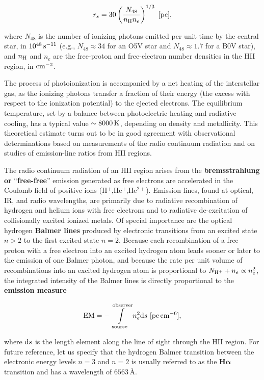 \documentclass[a4paper,10pt]{article}
\begin{document}
\begin{align*}
    r_s = 30 \left(\frac{N_{48}}{n_{\rm H}n_e}\right)^{1/3} ~ [{\rm pc}],
\end{align*}

{\noindent}where $N_{48}$ is the number of ionizing photons emitted per unit time by the central star, in $10^{48}\,{\rm s^{-11}}$ (e.g., $N_{48}\approx34$ for an O5V star and $N_{48}\approx1.7$ for a B0V star), and $n_{\rm H}$ and $n_e$ are the free-proton and free-electron number densities in the HII region, in ${\rm cm^{-3}}$.

{\noindent}The process of photoionization is accompanied by a
net heating of the interstellar gas, as the ionizing photons transfer a fraction of their energy (the excess with respect to the ionization potential) to the ejected electrons. The equilibrium temperature, set by a balance between photoelectric heating and radiative cooling, has a typical value $\sim8000\,{\rm K}$, depending on density and metallicity. This theoretical estimate turns out to be in good agreement with observational determinations based on measurements of the radio continuum radiation and on studies of emission-line ratios from HII regions.

{\noindent}The radio continuum radiation of an HII region arises
from the \textbf{bremsstrahlung or} ``\textbf{free-free}'' emission generated as free electrons are accelerated in the Coulomb field of positive ions (H$^+$,He$^+$,He$^{2+}$). Emission lines, found at optical, IR, and radio wavelengths, are primarily due to radiative recombination of hydrogen and helium ions with free electrons and to radiative de-excitation of collisionally excited ionized metals. Of special importance are the optical hydrogen \textbf{Balmer lines} produced by electronic transitions from an excited state $n>2$ to the first excited state $n=2$. Because each recombination of a free proton with a free electron into an excited hydrogen atom leads sooner or later to the emission of one Balmer photon, and because the rate per unit volume of recombinations into an excited hydrogen atom is proportional to $N_{\rm H^+} + n_e \propto n_e^2$, the integrated intensity of the Balmer lines is directly proportional to the \textbf{emission measure}

\begin{align*}
    {\rm EM} = -\int\limits_{\rm source}^{\rm observer}n_e^2{\rm d}s ~ [{\rm pc\,cm^{-6}}],
\end{align*}

{\noindent}where ${\rm d}s$ is the length element along the line of sight through the HII region. For future reference, let us specify that the hydrogen Balmer transition between the electronic energy levels $n=3$ and $n=2$ is usually referred to as the $\mathbf{H\alpha}$ transition and has a wavelength of $6563$\,\AA.
\end{document}
